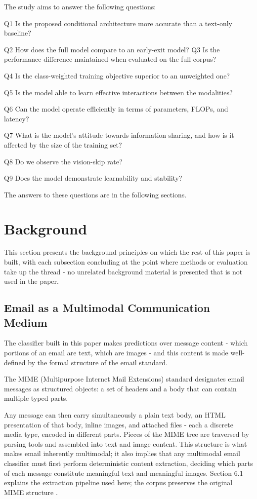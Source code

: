 \documentclass[10pt,twoside]{article}
\begin{document}
The study aims to answer the following questions:

Q1 Is the proposed conditional architecture more accurate than a text-only baseline?

Q2 How does the full model compare to an early-exit model? Q3 Is the performance difference maintained when evaluated on the full corpus?

Q4 Is the class-weighted training objective superior to an unweighted one?

Q5 Is the model able to learn effective interactions between the modalities?

Q6 Can the model operate efficiently in terms of parameters, FLOPs, and latency?

Q7 What is the model's attitude towards information sharing, and how is it affected by the size of the training set?

Q8 Do we observe the vision-skip rate?

Q9 Does the model demonstrate learnability and stability?

The answers to these questions are in the following sections.

\section{Background}\label{sec:2}

This section presents the background principles on which the rest of this paper is built, with each subsection concluding at the point where methods or evaluation take up the thread - no unrelated background material is presented that is not used in the paper.

\subsection{Email as a Multimodal Communication Medium}\label{sec:2.1}

The classifier built in this paper makes predictions over message content - which portions of an email are text, which are images - and this content is made well-defined by the formal structure of the email standard.

The MIME (Multipurpose Internet Mail Extensions) standard \citep{rfc2045} designates email messages as structured objects: a set of headers and a body that can contain multiple typed parts.

Any message can then carry simultaneously a plain text body, an HTML presentation of that body, inline images, and attached files - each a discrete media type, encoded in different parts. Pieces of the MIME tree are traversed by parsing tools and assembled into text and image content. This structure is what makes email inherently multimodal; it also implies that any multimodal email classifier must first perform deterministic content extraction, deciding which parts of each message constitute meaningful text and meaningful images. Section 6.1 explains the extraction pipeline used here; the corpus preserves the original MIME structure \citep{spamassassin2006}.
\end{document}
